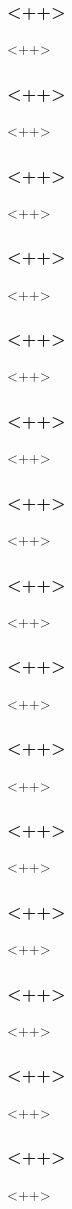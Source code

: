\begin{frame}[fragile]
\frametitle{<++>}
<++>
\end{frame}

\begin{frame}[fragile]
\frametitle{<++>}
<++>
\end{frame}

\begin{frame}[fragile]
\frametitle{<++>}
<++>
\end{frame}

\begin{frame}[fragile]
\frametitle{<++>}
<++>
\end{frame}

\begin{frame}[fragile]
\frametitle{<++>}
<++>
\end{frame}

\begin{frame}[fragile]
\frametitle{<++>}
<++>
\end{frame}

\begin{frame}[fragile]
\frametitle{<++>}
<++>
\end{frame}

\begin{frame}[fragile]
\frametitle{<++>}
<++>
\end{frame}

\begin{frame}[fragile]
\frametitle{<++>}
<++>
\end{frame}

\begin{frame}[fragile]
\frametitle{<++>}
<++>
\end{frame}

\begin{frame}[fragile]
\frametitle{<++>}
<++>
\end{frame}

\begin{frame}[fragile]
\frametitle{<++>}
<++>
\end{frame}

\begin{frame}[fragile]
\frametitle{<++>}
<++>
\end{frame}

\begin{frame}[fragile]
\frametitle{<++>}
<++>
\end{frame}

\begin{frame}[fragile]
\frametitle{<++>}
<++>
\end{frame}

